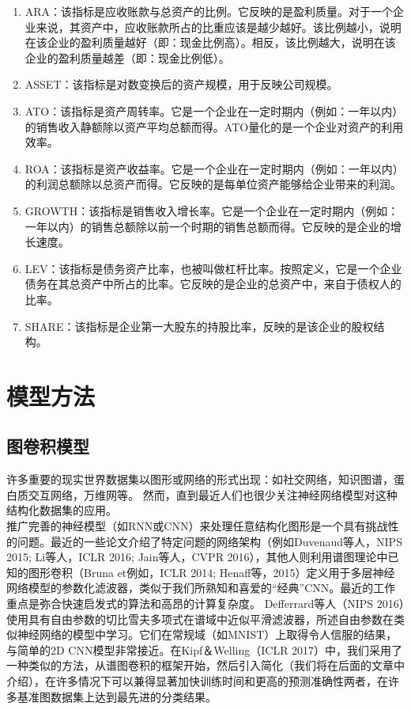 \documentclass[a4paper,UTF8]{article}
\begin{document}
\begin{enumerate}[(1)]
	\item ARA：该指标是应收账款与总资产的比例。它反映的是盈利质量。对于一个企业来说，其资产中，应收账款所占的比重应该是越少越好。该比例越小，说明在该企业的盈利质量越好（即：现金比例高）。相反，该比例越大，说明在该企业的盈利质量越差（即：现金比例低）。
	\item ASSET：该指标是对数变换后的资产规模，用于反映公司规模。
	
	\item ATO：该指标是资产周转率。它是一个企业在一定时期内（例如：一年以内）的销售收入静额除以资产平均总额而得。ATO量化的是一个企业对资产的利用效率。
	
	\item ROA：该指标是资产收益率。它是一个企业在一定时期内（例如：一年以内）的利润总额除以总资产而得。它反映的是每单位资产能够给企业带来的利润。
	\item GROWTH：该指标是销售收入增长率。它是一个企业在一定时期内（例如：一年以内）的销售总额除以前一个时期的销售总额而得。它反映的是企业的增长速度。
	\item LEV：该指标是债务资产比率，也被叫做杠杆比率。按照定义，它是一个企业债务在其总资产中所占的比率。它反映的是企业的总资产中，来自于债权人的比率。
	\item SHARE：该指标是企业第一大股东的持股比率，反映的是该企业的股权结构。
\end{enumerate}
\section{模型方法}

\subsection{图卷积模型}

许多重要的现实世界数据集以图形或网络的形式出现：如社交网络，知识图谱，蛋白质交互网络，万维网等。 然而，直到最近人们也很少关注神经网络模型对这种结构化数据集的应用。\\

推广完善的神经模型（如RNN或CNN）来处理任意结构化图形是一个具有挑战性的问题。最近的一些论文介绍了特定问题的网络架构（例如Duvenaud等人，NIPS 2015; Li等人，ICLR 2016; Jain等人，CVPR 2016），其他人则利用谱图理论中已知的图形卷积（Bruna et例如，ICLR 2014; Henaff等，2015）定义用于多层神经网络模型的参数化滤波器，类似于我们所熟知和喜爱的“经典”CNN。最近的工作重点是弥合快速启发式的算法和高昂的计算复杂度。 Defferrard等人（NIPS 2016）使用具有自由参数的切比雪夫多项式在谱域中近似平滑滤波器，所述自由参数在类似神经网络的模型中学习。它们在常规域（如MNIST）上取得令人信服的结果，与简单的2D CNN模型非常接近。在Kipf＆Welling（ICLR 2017）中，我们采用了一种类似的方法，从谱图卷积的框架开始，然后引入简化（我们将在后面的文章中介绍），在许多情况下可以兼得显著加快训练时间和更高的预测准确性两者，在许多基准图数据集上达到最先进的分类结果。\\
\end{document}

